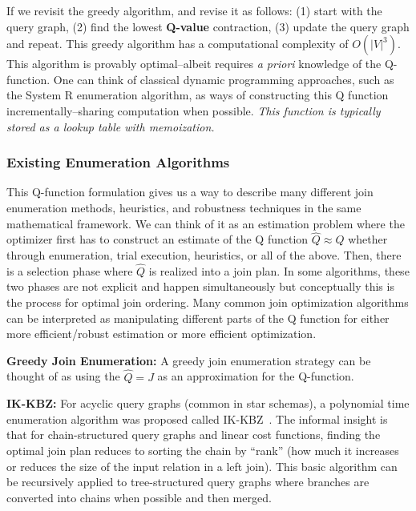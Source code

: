 If we revisit the greedy algorithm, and revise it as follows: (1) start with the query graph, (2) find the lowest \textbf{Q-value} contraction, (3) update the query graph and repeat. This greedy algorithm has a computational complexity of $O(|V|^3)$. This algorithm is provably optimal--albeit requires \emph{a priori} knowledge of the Q-function.
One can think of classical dynamic programming approaches, such as the System R enumeration algorithm, as ways of constructing this Q function incrementally--sharing computation when possible.
\emph{This function is typically stored as a lookup table with memoization.}

\subsubsection{Existing Enumeration Algorithms}
This Q-function formulation gives us a way to describe many different join enumeration methods, heuristics, and robustness techniques in the same mathematical framework. We can think of it as an estimation problem where the optimizer first has to construct an estimate of the Q function $\hat{Q} \approx Q$ whether through enumeration, trial execution, heuristics, or all of the above. Then, there is a selection phase where $\hat{Q}$ is realized into a join plan. In some algorithms, these two phases are not explicit and happen simultaneously but conceptually this is the process for optimal join ordering. Many common join optimization algorithms can be interpreted as manipulating different parts of the Q function for either more efficient/robust estimation or more efficient optimization.

\vspace{0.25em} \noindent \textbf{Greedy Join Enumeration: } A greedy join enumeration strategy can be thought of as using the $\hat{Q} = J$ as an approximation for the Q-function.

\vspace{0.25em} \noindent \textbf{IK-KBZ: } For acyclic query graphs (common in star schemas), a polynomial time enumeration algorithm was proposed called IK-KBZ~\cite{?}. The informal insight is that for chain-structured query graphs and linear cost functions, finding the optimal join plan reduces to sorting the chain by ``rank'' (how much it increases or reduces the size of the input relation in a left join). This basic algorithm can be recursively applied to tree-structured query graphs where branches are converted into chains when possible and then merged. 

